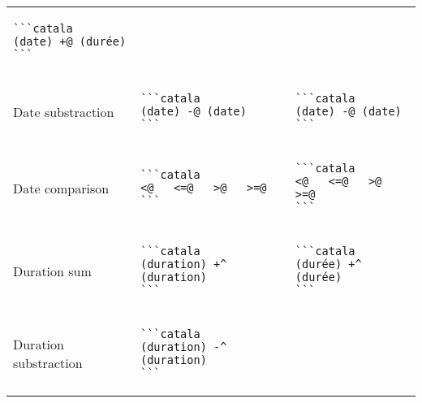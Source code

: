 \documentclass[a3paper,landscape]{article}
\begin{document}
\begin{multicols*}{2}
\begin{center}
\begin{tabular}{p{}p{}p{}}
      \begin{verbatim}
```catala
(date) +@ (durée)
```
\end{verbatim}
      \vspace*{-1.75em}
      \\
      Date substraction               &
      \vspace*{-1.75em}
      \begin{verbatim}
```catala
(date) -@ (date)
```
\end{verbatim}
      \vspace*{-1.75em}
                                      &
      \vspace*{-1.75em}
      \begin{verbatim}
```catala
(date) -@ (date)
```
\end{verbatim}
      \vspace*{-1.75em}
      \\
      Date comparison                 &
      \vspace*{-1.75em}
      \begin{verbatim}
```catala
<@   <=@   >@   >=@
```
\end{verbatim}
      \vspace*{-1.75em}
                                      &
      \vspace*{-1.75em}
      \begin{verbatim}
```catala
<@   <=@   >@   >=@
```
\end{verbatim}
      \vspace*{-1.75em}
      \\
      Duration sum                    &
      \vspace*{-1.75em}
      \begin{verbatim}
```catala
(duration) +^ (duration)
```
\end{verbatim}
      \vspace*{-1.75em}
                                      &
      \vspace*{-1.75em}
      \begin{verbatim}
```catala
(durée) +^ (durée)
```
\end{verbatim}
      \vspace*{-1.75em}
      \\
      Duration substraction           &
      \vspace*{-1.75em}
      \begin{verbatim}
```catala
(duration) -^ (duration)
```
\end{verbatim}

\end{tabular}
\end{center}
\end{multicols*}
\end{document}
